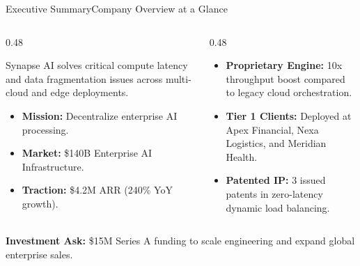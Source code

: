 \documentclass[aspectratio=169,10pt]{beamer}
\begin{document}
\begin{frame}{Executive Summary}{Company Overview at a Glance}
  \vspace*{-0.1cm}
  \begin{columns}[T]
    \begin{column}{0.48\textwidth}
      \begin{tcolorbox}[cyancard, title={\small\faRocket\ Opportunity Summary}]
        \small
        Synapse AI solves critical compute latency and data fragmentation issues across multi-cloud and edge deployments.
        \vspace*{0.1cm}
        \begin{itemize}
          \item \textbf{Mission:} Decentralize enterprise AI processing.
          \item \textbf{Market:} \$140B Enterprise AI Infrastructure.
          \item \textbf{Traction:} \$4.2M ARR (240\% YoY growth).
        \end{itemize}
      \end{tcolorbox}
    \end{column}
    
    \begin{column}{0.48\textwidth}
      \begin{tcolorbox}[purplecard, title={\small\faTrophy\ Core Highlights}]
        \small
        \begin{itemize}
          \item \textbf{Proprietary Engine:} 10x throughput boost compared to legacy cloud orchestration.
          \item \textbf{Tier 1 Clients:} Deployed at Apex Financial, Nexa Logistics, and Meridian Health.
          \item \textbf{Patented IP:} 3 issued patents in zero-latency dynamic load balancing.
        \end{itemize}
      \end{tcolorbox}
    \end{column}
  \end{columns}
  
  \vspace*{0.15cm}
  \begin{tcolorbox}[darkcard]
    \centering \small
    \color{neoncyan}\textbf{Investment Ask:} \color{textlight}\$15M Series A funding to scale engineering and expand global enterprise sales.
  \end{tcolorbox}
\end{frame}
\end{document}
